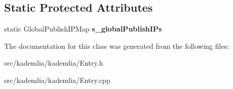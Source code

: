 \subsection*{Static Protected Attributes}
\begin{DoxyCompactItemize}
\item 
static GlobalPublishIPMap {\bfseries s\_\-globalPublishIPs}\label{classKademlia_1_1CKeyEntry_a2e103edfa8e26c5f25a08d209bf118fb}

\end{DoxyCompactItemize}


The documentation for this class was generated from the following files:\begin{DoxyCompactItemize}
\item 
src/kademlia/kademlia/Entry.h\item 
src/kademlia/kademlia/Entry.cpp\end{DoxyCompactItemize}
